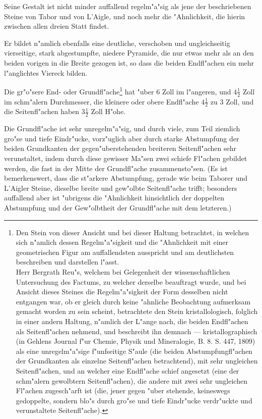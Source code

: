 \documentclass[a4paper, 11pt, oneside, german]{article}
\begin{document}
Seine Gestalt ist nicht minder auffallend regelm"a"sig als jene der beschriebenen Steine von Tabor und von L'Aigle, und noch mehr die "Ahnlichkeit, die hierin zwischen allen dreien Statt findet.

Er bildet n"amlich ebenfalls eine deutliche, verschoben und ungleichseitig vierseitige, stark abgestumpfte, niedere Pyramide, die nur etwas mehr als an den beiden vorigen in die Breite gezogen ist, so dass die beiden Endfl"achen ein mehr l"anglichtes Viereck bilden.

Die gr"o"sere End- oder Grundfl"ache\footnote{Den Stein von dieser Ansicht und bei dieser Haltung betrachtet, in welchen sich n"amlich dessen Regelm"a"sigkeit und die "Ahnlichkeit mit einer geometrischen Figur am auffallendsten ausspricht und am deutlichsten beschreiben und darstellen l"asst.\\
Herr Bergrath Reu"s, welchem bei Gelegenheit der wissenschaftlichen Untersuchung des Factums, zu welcher derselbe beauftragt wurde, und bei Ansicht dieses Steines die Regelm"a"sigkeit der Form desselben nicht entgangen war, ob er gleich durch keine "ahnliche Beobachtung aufmerksam gemacht worden zu sein scheint, betrachtete den Stein kristallologisch, folglich in einer andern Haltung, n"amlich der L"ange nach, die beiden Endfl"achen als Seitenfl"achen nehmend, und beschreibt ihn demnach --- kristallographisch (in Gehlens Journal f"ur Chemie, Physik und Mineralogie, B. 8. S. 447, 1809) als eine unregelm"a"sige f"unfseitige S"aule (die beiden Abstumpfungfl"achen der Grundkanten als einzelne Seitenfl"achen betrachtend), mit sehr ungleichen Seitenfl"achen, und an welcher eine Endfl"ache schief angesetzt (eine der schm"alern gewolbtern Seitenfl"achen), die andere mit zwei sehr ungleichen Fl"achen zugesch"arft ist (die, jener gegen "uber stehende, keineswegs gedoppelte, sondern blo"s durch gro"se und tiefe Eindr"ucke verdr"uckte und verunstaltete Seitenfl"ache).} hat "uber 6 Zoll im l"angeren, und $4\frac{1}{2}$ Zoll im schm"alern Durchmesser, die kleinere oder obere Endfl"ache $4\frac{1}{2}$ zu 3 Zoll, und die Seitenfl"achen haben $3\frac{1}{2}$ Zoll H"ohe.

Die Grundfl"ache ist sehr unregelm"a"sig, und durch viele, zum Teil ziemlich gro"se und tiefe Eindr"ucke, vorz"uglich aber durch starke Abstumpfung der beiden Grundkanten der gegen"uberstehenden breiteren Seitenfl"achen sehr verunstaltet, indem durch diese gewisser Ma"sen zwei schiefe Fl"achen gebildet werden, die fast in der Mitte der Grundfl"ache zusammensto"sen. (Es ist bemerkenswert, dass die st"arkere Abstumpfung, gerade wie beim Taborer und L'Aigler Steine, dieselbe breite und gew"olbte Seitenfl"ache trifft; besonders auffallend aber ist "ubrigens die "Ahnlichkeit hinsichtlich der doppelten Abstumpfung und der Gew"olbtheit der Grundfl"ache mit dem letzteren.)
\end{document}
